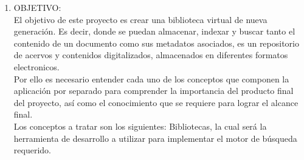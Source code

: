 \begin{enumerate}[1.]
\item OBJETIVO:
\\ El objetivo de este proyecto es crear una biblioteca virtual de nueva generación.
Es decir, donde se puedan almacenar, indexar y buscar tanto el contenido de un documento como sus metadatos asociados, es un repositorio de acervos y contenidos digitalizados, almacenados en diferentes formatos electronicos.
\\ Por ello es necesario entender cada uno de los conceptos que componen la aplicación por separado para comprender la importancia 	del producto final del 	proyecto, así como el conocimiento que se requiere para lograr el alcance final.
\\ Los conceptos a tratar son los siguientes: Bibliotecas, la cual será la herramienta de desarrollo a utilizar para implementar el 	motor de búsqueda requerido. 


\end{enumerate} 
